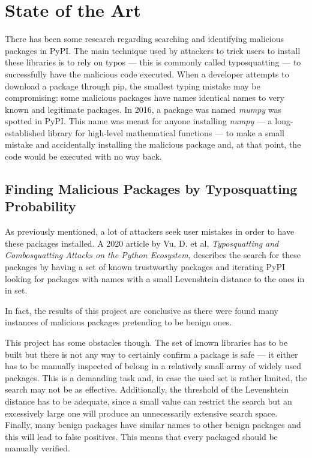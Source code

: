 \chapter{State of the Art}
There has been some research regarding searching and identifying malicious packages in PyPI. The main technique used by attackers to trick users to install these libraries is to rely on typos — this is commonly called typosquatting — to successfully have the malicious code executed. When a developer attempts to download a package through pip, the smallest typing mistake may be compromising: some malicious packages have names identical names to very known and legitimate packages. In 2016, a package was named \textit{mumpy} was spotted in PyPI. This name was meant for anyone installing \textit{numpy} — a long-established library for high-level mathematical functions — to make a small mistake and accidentally installing the malicious package and, at that point, the code would be executed with no way back.

\section{Finding Malicious Packages by Typosquatting Probability}
As previously mentioned, a lot of attackers seek user mistakes in order to have these packages installed. A 2020 article by Vu, D. et al, \textit{Typosquatting and Combosquatting Attacks on the Python Ecosystem},  describes the search for these packages by having a set of known trustworthy packages and iterating PyPI looking for packages with names with a small Levenshtein distance to the ones in in set.

In fact, the results of this project are conclusive as there were found many instances of malicious packages pretending to be benign ones.

This project has some obstacles though. The set of known libraries has to be built but there is not any way to certainly confirm a package is safe — it either has to be manually inspected of belong in a relatively small array of widely used packages. This is a demanding task and, in case the used set is rather limited, the search may not be as effective.
Additionally, the threshold of the Levenshtein distance has to be adequate, since a small value can restrict the search but an excessively large one will produce an unnecessarily extensive search space.
Finally, many benign packages have similar names to other benign packages and this will lead to false positives. This means that every packaged should be manually verified.

